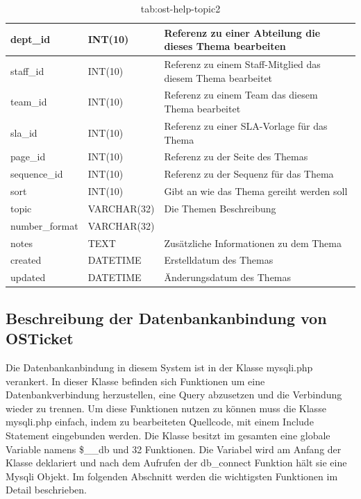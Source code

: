 		\begin{table}[h]
			\begin{tabular}{|p{3.5cm}|p{4cm}|p{6.2cm}|}
		\hline
		dept\_id & INT(10) & Referenz zu einer Abteilung die dieses Thema bearbeiten\\
		\hline
		staff\_id & INT(10) & Referenz zu einem Staff-Mitglied das diesem Thema bearbeitet\\
		\hline
		team\_id & INT(10) & Referenz zu einem Team das diesem Thema bearbeitet\\
		\hline
		sla\_id & INT(10) & Referenz zu einer SLA-Vorlage für das Thema\\
		\hline
		page\_id & INT(10) & Referenz zu der Seite des Themas\\
		\hline
		sequence\_id & INT(10) & Referenz zu der Sequenz für das Thema\\
		\hline
		sort & INT(10) & Gibt an wie das Thema gereiht werden soll\\
		\hline
		topic & VARCHAR(32) & Die Themen Beschreibung\\
		\hline
		number\_format & VARCHAR(32) & \\
		\hline
		notes & TEXT & Zusätzliche Informationen zu dem Thema\\
		\hline
		created & DATETIME & Erstelldatum des Themas\\
		\hline
		updated & DATETIME & Änderungsdatum des Themas\\
		\hline
		
	\end{tabular}
	\caption{tab:ost-help-topic2}
\end{table}
\label{tab:ost_help_topic2}

\newpage


\subsection{Beschreibung der Datenbankanbindung von OSTicket}
Die Datenbankanbindung in diesem System ist in der Klasse mysqli.php verankert. In dieser Klasse befinden sich Funktionen um eine Datenbankverbindung herzustellen, eine Query abzusetzen und die Verbindung wieder zu trennen.
Um diese Funktionen nutzen zu können muss die Klasse mysqli.php einfach, indem zu bearbeiteten Quellcode, mit einem Include Statement eingebunden werden.
Die Klasse besitzt im gesamten eine globale Variable namens \$\_\_db und 32 Funktionen. Die Variabel wird am Anfang der Klasse deklariert und nach dem Aufrufen der db\_connect Funktion hält sie eine Mysqli Objekt.
Im folgenden Abschnitt werden die wichtigsten Funktionen im Detail beschrieben.

